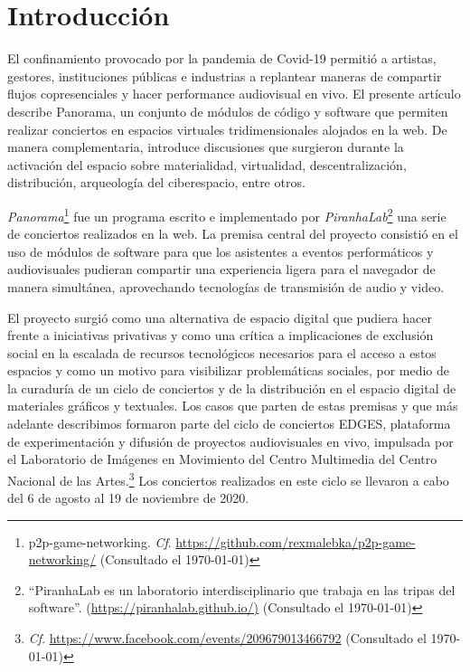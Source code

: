 
\section*{Introducción} %

El confinamiento provocado por la pandemia de Covid-19 permitió a artistas, gestores, instituciones públicas e industrias a replantear maneras de compartir flujos copresenciales y hacer performance audiovisual en vivo. El presente artículo describe Panorama, un conjunto de módulos de código y software que permiten realizar conciertos en espacios virtuales tridimensionales alojados en la web. De manera complementaria, introduce discusiones que surgieron durante la activación del espacio sobre materialidad, virtualidad, descentralización, distribución, arqueología del ciberespacio, entre otros. 

\emph{Panorama}\footnote{p2p-game-networking. \emph{Cf}. \url{https://github.com/rexmalebka/p2p-game-networking/} (Consultado el \today)} fue un programa escrito e implementado por \emph{PiranhaLab}\footnote{``PiranhaLab es un laboratorio interdisciplinario que trabaja en las tripas del software''. (\url{https://piranhalab.github.io/)} (Consultado el \today)} una serie de conciertos realizados en la web. La premisa central del proyecto consistió en el uso de módulos de software para que los asistentes a eventos performáticos y audiovisuales pudieran compartir una experiencia ligera para el navegador de manera simultánea, aprovechando tecnologías de transmisión de audio y video. 

El proyecto surgió como una alternativa de espacio digital que pudiera hacer frente a iniciativas privativas y como una crítica a implicaciones de exclusión social en la escalada de recursos tecnológicos necesarios para el acceso a estos espacios y como un motivo para visibilizar problemáticas sociales, por medio de la curaduría de un ciclo de conciertos y de la distribución en el espacio digital de materiales gráficos y textuales. Los casos que parten de estas premisas y que más adelante describimos formaron parte del ciclo de conciertos EDGES, plataforma de experimentación y difusión de proyectos audiovisuales en vivo, impulsada por el Laboratorio de Imágenes en Movimiento del Centro Multimedia del Centro Nacional de las Artes.\footnote{\emph{Cf}. \url{https://www.facebook.com/events/209679013466792} (Consultado el \today)} Los conciertos realizados en este ciclo se llevaron a cabo del 6 de agosto al 19 de noviembre de 2020.


